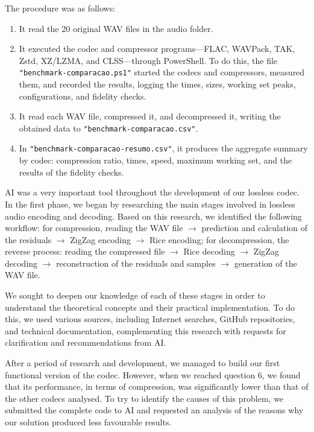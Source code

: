 The procedure was as follows:

\begin{enumerate}
    \item It read the 20 original WAV files in the audio folder.

    \item It executed the codec and compressor programs---FLAC, WAVPack, TAK, Zstd, XZ/LZMA, and CLSS---through PowerShell. To do this, the file \texttt{"benchmark-comparacao.ps1"} started the codecs and compressors, measured them, and recorded the results, logging the times, sizes, working set peaks, configurations, and fidelity checks.

    \item It read each WAV file, compressed it, and decompressed it, writing the obtained data to \texttt{"benchmark-comparacao.csv"}.

    \item In \texttt{"benchmark-comparacao-resumo.csv"}, it produces the aggregate summary by codec: compression ratio, times, speed, maximum working set, and the results of the fidelity checks.
\end{enumerate}

AI was a very important tool throughout the development of our lossless codec. In the first phase, we began by researching the main stages involved in lossless audio encoding and decoding. Based on this research, we identified the following workflow: for compression, reading the WAV file $\rightarrow$ prediction and calculation of the residuals $\rightarrow$ ZigZag encoding $\rightarrow$ Rice encoding; for decompression, the reverse process: reading the compressed file $\rightarrow$ Rice decoding $\rightarrow$ ZigZag decoding $\rightarrow$ reconstruction of the residuals and samples $\rightarrow$ generation of the WAV file.

We sought to deepen our knowledge of each of these stages in order to understand the theoretical concepts and their practical implementation. To do this, we used various sources, including Internet searches, GitHub repositories, and technical documentation, complementing this research with requests for clarification and recommendations from AI.

After a period of research and development, we managed to build our first functional version of the codec. However, when we reached question 6, we found that its performance, in terms of compression, was significantly lower than that of the other codecs analysed. To try to identify the causes of this problem, we submitted the complete code to AI and requested an analysis of the reasons why our solution produced less favourable results.


